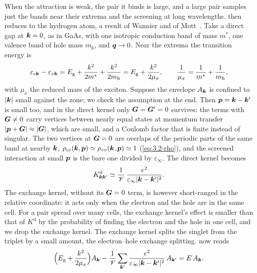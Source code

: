 When the attraction is weak, the pair it binds is large, and a large pair samples just the bands near their extrema and the screening at long wavelengths.  then reduces to the hydrogen atom, a result of Wannier and of Mott~\cite{wannier1937structure,mott1938conduction}. Take a direct gap at $\bm{k} = 0$, as in GaAs, with one isotropic conduction band of mass $m^*$, one valence band of hole mass $m_{\mathrm{h}}$, and $\bm{q} \to 0$. Near the extrema the transition energy is
\begin{equation*}
  \varepsilon_{c\bm{k}} - \varepsilon_{v\bm{k}} = E_{\mathrm{g}} + \frac{k^2}{2m^*} + \frac{k^2}{2m_{\mathrm{h}}} = E_{\mathrm{g}} + \frac{k^2}{2\mu_x}, \qquad \frac{1}{\mu_x} = \frac{1}{m^*} + \frac{1}{m_{\mathrm{h}}} ,
\end{equation*}
with $\mu_x$ the reduced mass of the exciton. Suppose the envelope $A_{\bm{k}}$ is confined to $|\bm{k}|$ small against the zone; we check the assumption at the end. Then $\bm{p} = \bm{k} - \bm{k}'$ is small too, and in the direct kernel only $\bm{G} = \bm{G}' = 0$ survives: the terms with $\bm{G} \ne 0$ carry vertices between nearly equal states at momentum transfer $|\bm{p} + \bm{G}| \approx |\bm{G}|$, which are small, and a Coulomb factor that is finite instead of singular. The two vertices at $\bm{G} = 0$ are overlaps of the periodic parts of the same band at nearby $\bm{k}$, $\rho_{cc}(\bm{k},\bm{p}) \simeq \rho_{vv}(\bm{k},\bm{p}) \simeq 1$ (\cref{eq:3.2-rho}), and the screened interaction at small $\bm{p}$ is the bare one divided by $\varepsilon_\infty$. The direct kernel becomes
\begin{equation*}
  K^{\mathrm{d}}_{\bm{k}\bm{k}'} \simeq \frac{1}{\mathscr{V}}\,\frac{e^2}{\varepsilon_\infty|\bm{k} - \bm{k}'|^2} .
\end{equation*}
The exchange kernel, without its $\bm{G} = 0$ term, is however short-ranged in the relative coordinate: it acts only when the electron and the hole are in the same cell. For a pair spread over many cells, the exchange kernel's effect is smaller than that of $K^{\mathrm{d}}$ by the probability of finding the electron and the hole in one cell, and we drop the exchange kernel. The exchange kernel splits the singlet from the triplet by a small amount, the electron--hole exchange splitting.  now reads
\begin{equation*}
  \Bigl(E_{\mathrm{g}} + \frac{k^2}{2\mu_x}\Bigr)A_{\bm{k}} - \frac1{\mathscr{V}}\sum_{\bm{k}'}\frac{e^2}{\varepsilon_\infty|\bm{k} - \bm{k}'|^2}\,A_{\bm{k}'} = E\,A_{\bm{k}} .
\end{equation*}
